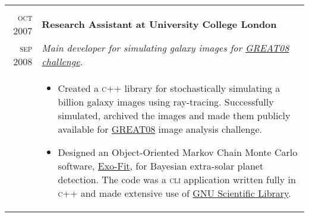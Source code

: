 \documentclass[a4paper,10pt]{article}
\begin{document}
\begin{tabular}{r|p{11cm}}
\multicolumn{2}{c}{} \\
\textsc{oct 2007} & \textbf{Research Assistant at University College London} \\
\textsc{sep 2008}	&\emph{Main developer for simulating galaxy images for \href{http://www.great08challenge.info/}{GREAT08 challenge}.}\\
& \small{
\begin{itemize}
  \item Created a \textsc{c++} library for stochastically simulating a billion galaxy images using ray-tracing.
  Successfully simulated, archived the images and made them publicly available for \href{http://www.great08challenge.info/}{GREAT08} image analysis challenge.
  \item Designed an Object-Oriented Markov Chain Monte Carlo software, \href{http://zuserver2.star.ucl.ac.uk/~lahav/exofit.html}{Exo-Fit}, for Bayesian extra-solar planet
  detection. The code was a \textsc{cli} application written fully in \textsc{c++} and made extensive use of
  \href{https://www.gnu.org/software/gsl/}{GNU Scientific Library}.
\end{itemize}
}
\end{tabular}

\end{document}
